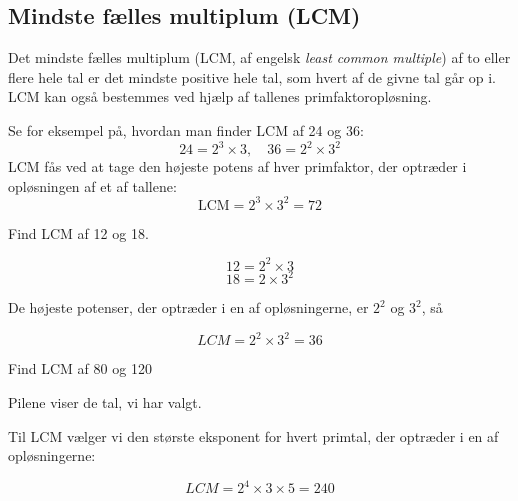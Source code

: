 \subsection*{Mindste fælles multiplum (LCM)}
Det mindste fælles multiplum (LCM, af engelsk \emph{least common multiple}) af to eller flere hele tal er det mindste positive hele tal, som hvert af de givne tal går op i. LCM kan også bestemmes ved hjælp af tallenes primfaktoropløsning. 

Se for eksempel på, hvordan man finder LCM af 24 og 36:
\[
24 = 2^3 \times 3, \quad 36 = 2^2 \times 3^2
\]
LCM fås ved at tage den højeste potens af hver primfaktor, der optræder i opløsningen af et af tallene:
\[
\text{LCM} = 2^3 \times 3^2 = 72
\]

\begin{example} Find LCM af 12 og 18.

\begin{solution}
\[
12 = 2^2\times 3
\]
\[
18 = 2 \times 3^2
\]

De højeste potenser, der optræder i en af opløsningerne, er $2^2$ og $3^2$, så

\[
LCM = 2^2 \times 3^2 = 36
\]
    
\end{solution}
    
\end{example}

\begin{example} Find LCM af 80 og 120

\begin{solution}
    

Pilene viser de tal, vi har valgt.


Til LCM vælger vi den største eksponent for hvert primtal, der optræder i en af opløsningerne:

\[
LCM = 2^4\times 3 \times 5 = 240
\]
\end{solution}

\end{example}


